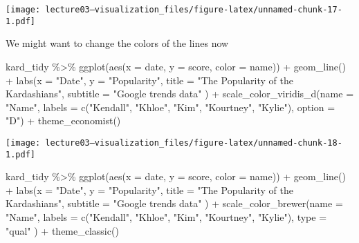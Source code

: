 \documentclass[
]{article}
\newenvironment{Shaded}{\begin{snugshade}}{\end{snugshade}}
\newcommand{\AttributeTok}[1]{\textcolor[rgb]{0.77,0.63,0.00}{#1}}
\newcommand{\FunctionTok}[1]{\textcolor[rgb]{0.00,0.00,0.00}{#1}}
\newcommand{\NormalTok}[1]{#1}
\newcommand{\SpecialCharTok}[1]{\textcolor[rgb]{0.00,0.00,0.00}{#1}}
\newcommand{\StringTok}[1]{\textcolor[rgb]{0.31,0.60,0.02}{#1}}
\begin{document}
\texttt{[image: lecture03---visualization\_files/figure-latex/unnamed-chunk-17-1.pdf]}

We might want to change the colors of the lines now

\begin{Shaded}
\begin{Highlighting}[]
\NormalTok{kard\_tidy }\SpecialCharTok{\%\textgreater{}\%} 
  \FunctionTok{ggplot}\NormalTok{(}\FunctionTok{aes}\NormalTok{(}\AttributeTok{x =}\NormalTok{ date, }\AttributeTok{y =}\NormalTok{ score, }\AttributeTok{color =}\NormalTok{ name)) }\SpecialCharTok{+}
  \FunctionTok{geom\_line}\NormalTok{() }\SpecialCharTok{+}
  \FunctionTok{labs}\NormalTok{(}\AttributeTok{x =} \StringTok{"Date"}\NormalTok{,}
       \AttributeTok{y =} \StringTok{"Popularity"}\NormalTok{,}
       \AttributeTok{title =} \StringTok{"The Popularity of the Kardashians"}\NormalTok{,}
       \AttributeTok{subtitle =} \StringTok{"Google trends data"}
\NormalTok{       ) }\SpecialCharTok{+}
  \FunctionTok{scale\_color\_viridis\_d}\NormalTok{(}\AttributeTok{name =} \StringTok{"Name"}\NormalTok{,}
                       \AttributeTok{labels =} \FunctionTok{c}\NormalTok{(}\StringTok{"Kendall"}\NormalTok{, }\StringTok{"Khloe"}\NormalTok{, }\StringTok{"Kim"}\NormalTok{, }\StringTok{"Kourtney"}\NormalTok{, }\StringTok{"Kylie"}\NormalTok{),}
                       \AttributeTok{option =} \StringTok{"D"}\NormalTok{) }\SpecialCharTok{+}
  \FunctionTok{theme\_economist}\NormalTok{()}
\end{Highlighting}
\end{Shaded}

\texttt{[image: lecture03---visualization\_files/figure-latex/unnamed-chunk-18-1.pdf]}

\begin{Shaded}
\begin{Highlighting}[]
\NormalTok{kard\_tidy }\SpecialCharTok{\%\textgreater{}\%} 
  \FunctionTok{ggplot}\NormalTok{(}\FunctionTok{aes}\NormalTok{(}\AttributeTok{x =}\NormalTok{ date, }\AttributeTok{y =}\NormalTok{ score, }\AttributeTok{color =}\NormalTok{ name)) }\SpecialCharTok{+}
  \FunctionTok{geom\_line}\NormalTok{() }\SpecialCharTok{+}
  \FunctionTok{labs}\NormalTok{(}\AttributeTok{x =} \StringTok{"Date"}\NormalTok{,}
       \AttributeTok{y =} \StringTok{"Popularity"}\NormalTok{,}
       \AttributeTok{title =} \StringTok{"The Popularity of the Kardashians"}\NormalTok{,}
       \AttributeTok{subtitle =} \StringTok{"Google trends data"}
\NormalTok{       ) }\SpecialCharTok{+}
  \FunctionTok{scale\_color\_brewer}\NormalTok{(}\AttributeTok{name =} \StringTok{"Name"}\NormalTok{,}
                     \AttributeTok{labels =} \FunctionTok{c}\NormalTok{(}\StringTok{"Kendall"}\NormalTok{, }\StringTok{"Khloe"}\NormalTok{, }\StringTok{"Kim"}\NormalTok{, }\StringTok{"Kourtney"}\NormalTok{, }\StringTok{"Kylie"}\NormalTok{),}
                     \AttributeTok{type =} \StringTok{"qual"}
\NormalTok{                       ) }\SpecialCharTok{+}
  \FunctionTok{theme\_classic}\NormalTok{()}
\end{Highlighting}
\end{Shaded}
\end{document}
